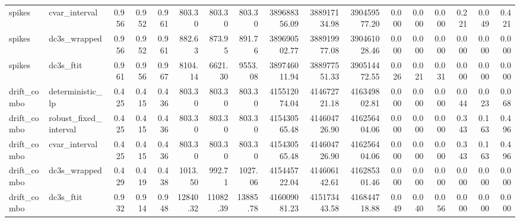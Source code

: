 \begin{tabular}{llrrrrrrrrrrrrrrr}
spikes & cvar\_interval & 0.956 & 0.952 & 0.961 & 803.30 & 803.30 & 803.30 & 389688356.09 & 388917134.98 & 390459577.20 & 0.000 & 0.000 & 0.000 & 0.221 & 0.049 & 0.421 \\
spikes & dc3s\_wrapped & 0.956 & 0.952 & 0.961 & 882.63 & 873.95 & 891.76 & 389690502.77 & 388919977.08 & 390461028.46 & 0.000 & 0.000 & 0.000 & 0.000 & 0.000 & 0.000 \\
spikes & dc3s\_ftit & 0.961 & 0.956 & 0.967 & 8104.14 & 6621.30 & 9553.08 & 389746011.94 & 388977551.33 & 390514472.55 & 0.026 & 0.021 & 0.031 & 0.000 & 0.000 & 0.000 \\
drift\_combo & deterministic\_lp & 0.425 & 0.415 & 0.436 & 803.30 & 803.30 & 803.30 & 415512074.04 & 414672721.18 & 416349802.81 & 0.000 & 0.000 & 0.000 & 0.044 & 0.023 & 0.068 \\
drift\_combo & robust\_fixed\_interval & 0.425 & 0.415 & 0.436 & 803.30 & 803.30 & 803.30 & 415430565.48 & 414604726.90 & 416256404.06 & 0.000 & 0.000 & 0.000 & 0.343 & 0.163 & 0.496 \\
drift\_combo & cvar\_interval & 0.425 & 0.415 & 0.436 & 803.30 & 803.30 & 803.30 & 415430565.48 & 414604726.90 & 416256404.06 & 0.000 & 0.000 & 0.000 & 0.343 & 0.163 & 0.496 \\
drift\_combo & dc3s\_wrapped & 0.429 & 0.419 & 0.438 & 1013.50 & 992.71 & 1027.06 & 415445722.04 & 414606142.61 & 416285301.46 & 0.000 & 0.000 & 0.000 & 0.000 & 0.000 & 0.000 \\
drift\_combo & dc3s\_ftit & 0.932 & 0.914 & 0.948 & 12840.32 & 11082.39 & 13885.78 & 416009081.23 & 415173443.58 & 416844718.88 & 0.049 & 0.040 & 0.056 & 0.000 & 0.000 & 0.000 \\
\bottomrule
\end{tabular}
